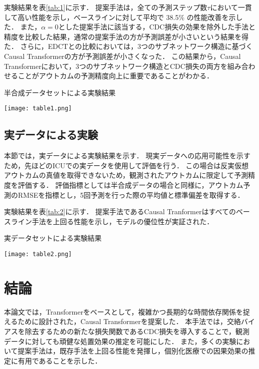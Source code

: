 \documentclass[dvipdfmx]{jreport}
\begin{document}
実験結果を表\ref{tab:1}に示す．
提案手法は，全ての予測ステップ数$\tau$において一貫して高い性能を示し，ベースラインに対して平均で 38.5\% の性能改善を示した．
また，$\alpha = 0$とした提案手法に該当する，CDC損失の効果を除外した手法と精度を比較した結果，通常の提案手法の方が予測誤差が小さいという結果を得た．
さらに，EDCTとの比較においては，3つのサブネットワーク構造に基づくCausal Transformerの方が予測誤差が小さくなった．
この結果から，Causal Transformerにおいて，3つのサブネットワーク構造とCDC損失の両方を組み合わせることがアウトカムの予測精度向上に重要であることがわかる．
\begin{table}[h]
    \begin{center}
        \caption{半合成データセットによる実験結果} \label{tab:1}
        \texttt{[image: table1.png]} 
    \end{center}
\end{table}

\subsection{実データによる実験}
本節では，実データによる実験結果を示す．
現実データへの応用可能性を示すため，先ほどのICUでの実データを使用して評価を行う．
この場合は反実仮想アウトカムの真値を取得できないため，観測されたアウトカムに限定して予測精度を評価する．
評価指標としては半合成データの場合と同様に，アウトカム予測のRMSEを指標とし，5回予測を行った際の平均値と標準偏差を取得する．

実験結果を表\ref{tab:2}に示す．
提案手法であるCausal Tranformerはすべてのベースライン手法を上回る性能を示し，モデルの優位性が実証された．
\begin{table}[h]
    \begin{center}
        \caption{実データセットによる実験結果} \label{tab:2}
        \texttt{[image: table2.png]} 
    \end{center}
\end{table}

\section{結論}
本論文では，Transformerをベースとして，複雑かつ長期的な時間依存関係を捉えるために設計された，Causal Transformerを提案した．
本手法では，交絡バイアスを除去するための新たな損失関数であるCDC損失を導入することで，観測データに対しても頑健な処置効果の推定を可能にした．
また，多くの実験において提案手法は，既存手法を上回る性能を発揮し，個別化医療での因果効果の推定に有用であることを示した．
\end{document}
